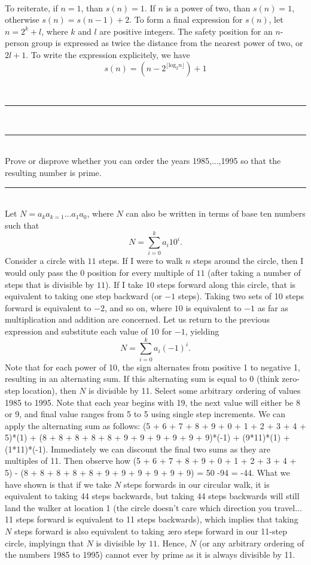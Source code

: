 \documentclass{article}
\newcommand{\problemsep}{\leavevmode\\[0.05in] \rule[\baselineskip/4]{\textwidth}{1pt} \\[0.005in] \rule[\baselineskip]{\textwidth}{1pt}\vspace{-\baselineskip/2}\leavevmode\\[0.05in]}
\newcommand{\statementsep}{\leavevmode\\[0.005in] \rule[\baselineskip/4]{\textwidth}{0.4pt}\leavevmode\\[0.005in]}
\begin{document}
\\[0.05in] To reiterate, if $n = 1$, than $s(n) = 1$. If $n$ is a power of two, than $s(n) = 1$, otherwise $s(n) = s(n-1) + 2$. To form a final expression for $s(n)$, let $n = 2^k + l$, where $k$ and $l$ are positive integers. The safety position for an $n$-person group is expressed as twice the distance from the nearest power of two, or $2l + 1$. To write the expression explicitely, we have 
\begin{equation*}
s(n) = \left (n - 2^{\lfloor \text{log}_2n \rfloor} \right ) + 1
\end{equation*}

\problemsep
Prove or disprove whether you can order the years 1985,...,1995 so that the resulting number is prime.
\statementsep
Let $N = a_ka_{k=1}...a_1a_0$, where $N$ can also be written in terms of base ten numbers such that
\begin{equation*}
	N = \sum_{i=0}^ka_i10^i.
\end{equation*}
Consider a circle with $11$ steps. If I were to walk $n$ steps around the circle, then I would only pass the $0$ position for every multiple of $11$ (after taking a number of steps that is divisible by $11$). If I take $10$ steps forward along this circle, that is equivalent to taking one step backward (or $-1$ steps). Taking two sets of 10 steps forward is equivalent to $-2$, and so on, where $10$ is equivalent to $-1$ as far as multiplication and addition are concerned. Let us return to the previous expression and substitute each value of $10$ for $-1$, yielding
\begin{equation*}
	N = \sum_{i=0}^ka_i(-1)^i.
\end{equation*}
Note that for each power of 10, the sign alternates from positive 1 to negative 1, resulting in an alternating sum.  If this alternating sum is equal to 0 (think zero-step location), then $N$ is divisible by 11. Select some arbitrary ordering of values 1985 to 1995. Note that each year begins with 19, the next value will either be 8 or 9, and final value ranges from 5 to 5 using single step increments. We can apply the alternating sum as follows: (5 + 6 + 7 + 8 + 9 + 0 + 1 + 2 + 3 + 4 + 5)*(1) + (8 + 8 + 8 + 8 + 8 + 9 + 9 + 9 + 9 + 9 + 9)*(-1) + (9*11)*(1) + (1*11)*(-1). Immediately we can discount the final two sums as they are multiples of 11.  Then observe how (5 + 6 + 7 + 8 + 9 + 0 + 1 + 2 + 3 + 4 + 5) - (8 + 8 + 8 + 8 + 8 + 9 + 9 + 9 + 9 + 9 + 9) = 50 -94 = -44. What we have shown is that if we take $N$ steps forwards in our circular walk, it is equivalent to taking 44 steps backwards, but taking 44 steps backwards will still land the walker at location 1 (the circle doesn't care which direction you travel... 11 steps forward is equivalent to 11 steps backwards), which implies that taking $N$ steps forward is also equivalent to taking {\emph zero} steps forward in our 11-step circle, implyingn that $N$ is divisible by $11$. Hence, $N$ (or any arbitrary ordering of the numbers 1985 to 1995) cannot ever by prime as it is always divisible by 11.
\end{document}
